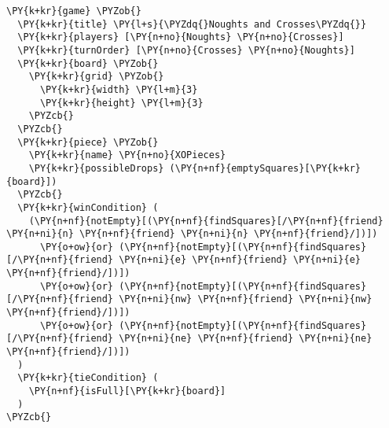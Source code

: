 \begin{Verbatim}[commandchars=\\\{\}]
\PY{k+kr}{game} \PYZob{}
  \PY{k+kr}{title} \PY{l+s}{\PYZdq{}Noughts and Crosses\PYZdq{}}
  \PY{k+kr}{players} [\PY{n+no}{Noughts} \PY{n+no}{Crosses}]
  \PY{k+kr}{turnOrder} [\PY{n+no}{Crosses} \PY{n+no}{Noughts}]
  \PY{k+kr}{board} \PYZob{}
    \PY{k+kr}{grid} \PYZob{}
      \PY{k+kr}{width} \PY{l+m}{3}
      \PY{k+kr}{height} \PY{l+m}{3}
    \PYZcb{}
  \PYZcb{}
  \PY{k+kr}{piece} \PYZob{}
    \PY{k+kr}{name} \PY{n+no}{XOPieces}
    \PY{k+kr}{possibleDrops} (\PY{n+nf}{emptySquares}[\PY{k+kr}{board}])
  \PYZcb{}
  \PY{k+kr}{winCondition} (
    (\PY{n+nf}{notEmpty}[(\PY{n+nf}{findSquares}[/\PY{n+nf}{friend} \PY{n+ni}{n} \PY{n+nf}{friend} \PY{n+ni}{n} \PY{n+nf}{friend}/])])
      \PY{o+ow}{or} (\PY{n+nf}{notEmpty}[(\PY{n+nf}{findSquares}[/\PY{n+nf}{friend} \PY{n+ni}{e} \PY{n+nf}{friend} \PY{n+ni}{e} \PY{n+nf}{friend}/])])
      \PY{o+ow}{or} (\PY{n+nf}{notEmpty}[(\PY{n+nf}{findSquares}[/\PY{n+nf}{friend} \PY{n+ni}{nw} \PY{n+nf}{friend} \PY{n+ni}{nw} \PY{n+nf}{friend}/])])
      \PY{o+ow}{or} (\PY{n+nf}{notEmpty}[(\PY{n+nf}{findSquares}[/\PY{n+nf}{friend} \PY{n+ni}{ne} \PY{n+nf}{friend} \PY{n+ni}{ne} \PY{n+nf}{friend}/])])
  )
  \PY{k+kr}{tieCondition} (
    \PY{n+nf}{isFull}[\PY{k+kr}{board}]
  )
\PYZcb{}
\end{Verbatim}
